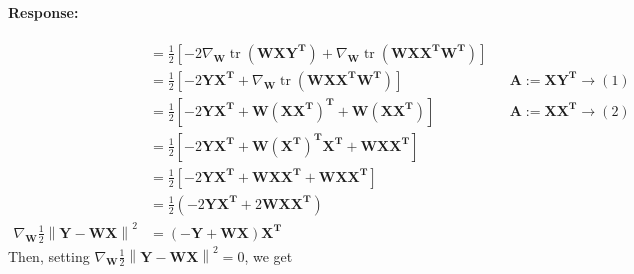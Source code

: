 \documentclass [11pt] {article}
\newcommand{\T}{\bf{T}}
\newcommand{\A}{\bf{A}}
\newcommand{\X}{\bf{X}}
\newcommand{\Y}{\bf{Y}}
\newcommand{\W}{\bf{W}}
\newenvironment{response}{\begin{responseframe}\vspace{-10pt}\paragraph{Response:}}{\end{responseframe}}
\DeclareMathOperator{\tr}{tr}
\renewcommand{\bf}[1]{\textbf{{#1}}}
\begin{document}
\begin{enumerate}
\begin{adjustwidth}{-8.4em}{-6em}
{\begin{response}
\begin{align*}
                                    &= 
                                    \frac{1}{2} 
                                    \left[
                                        -2 \nabla_{\W} \tr \left( \W \X \Y^{\T} \right) +
                                        \nabla_{\W} \tr \left( \W \X \X^{\T} \W^{\T} \right)
                                    \right] \\
                                    &= 
                                    \frac{1}{2} 
                                    \left[
                                        -2 \Y \X^{\T} +
                                        \nabla_{\W} \tr \left( \W \X \X^{\T} \W^{\T} \right) 
                                    \right]
                                    && \A := \X \Y^{\T} \to (1) \\
                                    &= 
                                    \frac{1}{2}
                                    \left[
                                        -2 \Y \X^{\T} +
                                        \W \left( \X \X^{\T} \right)^{\T} + \W \left( \X \X^{\T} \right)
                                    \right]
                                    && \A := \X \X^{\T} \to (2) \\
                                    &= 
                                    \frac{1}{2}
                                    \left[
                                        -2 \Y \X^{\T} +
                                        \W \left( \X^{\T} \right)^{\T} \X^{\T} + \W \X \X^{\T} 
                                    \right]
                                    \\
                                    &= 
                                    \frac{1}{2}
                                    \left[
                                        -2 \Y \X^{\T} +
                                        \W \X \X^{\T} + \W \X \X^{\T} 
                                    \right] \\
                                    &= \frac{1}{2} \left( -2 \Y \X^{\T} + 2 \W \X \X^{\T} \right) \\
                                    \nabla_{\W} \frac{1}{2} \left\| \Y - \W \X \right\|^2
                                    &= \left( -\Y + \W \X \right) \X^{\T}
                    \end{align*}
                    Then, setting $\nabla_{\W} \frac{1}{2} \left\| \Y - \W \X \right\|^2 = 0$, we
                    get
                    \begin{align*}

\end{align*}
\end{response}}
\end{adjustwidth}
\end{enumerate}
\end{document}
